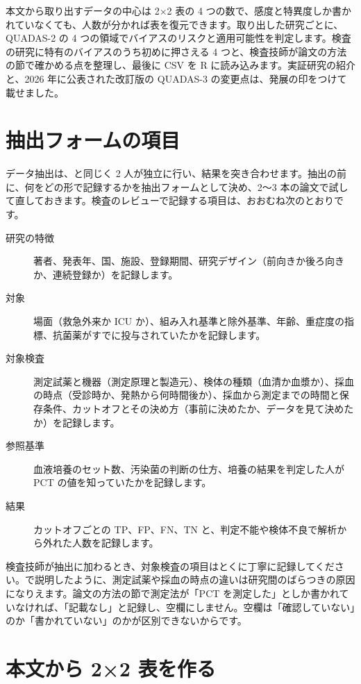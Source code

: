 \begin{chapintro}
本文から取り出すデータの中心は 2×2 表の 4 つの数で、感度と特異度しか書かれていなくても、人数が分かれば表を復元できます。取り出した研究ごとに、QUADAS-2 の 4 つの領域でバイアスのリスクと適用可能性を判定します。検査の研究に特有のバイアスのうち初めに押さえる 4 つと、検査技師が論文の方法の節で確かめる点を整理し、最後に CSV を R に読み込みます。実証研究の紹介と、2026 年に公表された改訂版の QUADAS-3 の変更点は、発展の印をつけて載せました。
\end{chapintro}

\section{抽出フォームの項目}
\label{sec:12-1}

データ抽出は、と同じく 2 人が独立に行い、結果を突き合わせます。抽出の前に、何をどの形で記録するかを抽出フォームとして決め、2〜3 本の論文で試して直しておきます。検査のレビューで記録する項目は、おおむね次のとおりです。
\begin{description}
\item[研究の特徴] 著者、発表年、国、施設、登録期間、研究デザイン（前向きか後ろ向きか、連続登録か）を記録します。
\item[対象] 場面（救急外来か ICU か）、組み入れ基準と除外基準、年齢、重症度の指標、抗菌薬がすでに投与されていたかを記録します。
\item[対象検査] 測定試薬と機器（測定原理と製造元）、検体の種類（血清か血漿か）、採血の時点（受診時か、発熱から何時間後か）、採血から測定までの時間と保存条件、カットオフとその決め方（事前に決めたか、データを見て決めたか）を記録します。
\item[参照基準] 血液培養のセット数、汚染菌の判断の仕方、培養の結果を判定した人が PCT の値を知っていたかを記録します。
\item[結果] カットオフごとの TP、FP、FN、TN と、判定不能や検体不良で解析から外れた人数を記録します。
\end{description}

検査技師が抽出に加わるとき、対象検査の項目はとくに丁寧に記録してください。で説明したように、測定試薬や採血の時点の違いは研究間のばらつきの原因になりえます。論文の方法の節で測定法が「PCT を測定した」としか書かれていなければ、「記載なし」と記録し、空欄にしません。空欄は「確認していない」のか「書かれていない」のかが区別できないからです。

\section{本文から 2×2 表を作る}
\label{sec:12-2}


